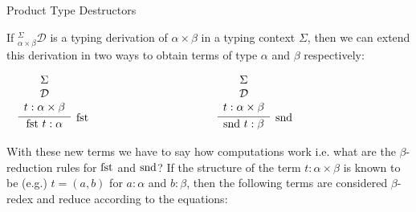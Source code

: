 \documentclass{book}
\begin{document}
        \begin{definition}{Product Type Destructors}
    
            If $^{\Sigma}_{\alpha \times \beta}\mathcal{D}$ is a typing derivation of $\alpha \times \beta$ in a typing context $\Sigma$, then we can extend this derivation in two ways to obtain terms of type $\alpha$ and $\beta$ respectively: 
    
            \begin{center}
                $\begin{array} { c c c }
                
                \begin{array}{ c  c  c }			
                     \infer[\fst]{\fst \ t : \alpha}
                        {\begin{array}{c}
                            \Sigma \\
                            \mathcal{D} \\
                            t : \alpha \times \beta
                        \end{array}}
                \end{array}
        
                & \hspace{3cm} &
        
                \begin{array}{ c  c  c }			
                    \infer[\snd]{\snd \ t : \beta}
                    {\begin{array}{c}
                        \Sigma \\
                        \mathcal{D} \\
                        t : \alpha \times \beta
                    \end{array}}	
                \end{array}\\		
        
                \end{array}$
            \end{center}	
        \end{definition}

        With these new terms we have to say how computations work i.e. what are the $\beta$-reduction rules for $\text{fst}$ and  $\text{snd}$? If the structure of the term $t : \alpha \times \beta$ is known to be (e.g.) $t = (a,b)$ for $a: \alpha$ and $b: \beta$, then the following terms are considered $\beta$-redex and reduce according to the equations: 
\end{document}
